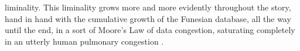 liminality. This liminality grows more and more evidently throughout the story, hand in hand with the cumulative growth of the Funesian database, all the way until the end, in a sort of Moore's Law of data congestion, saturating completely in an utterly human pulmonary congestion \parencite{Ovi19:Mem}.






